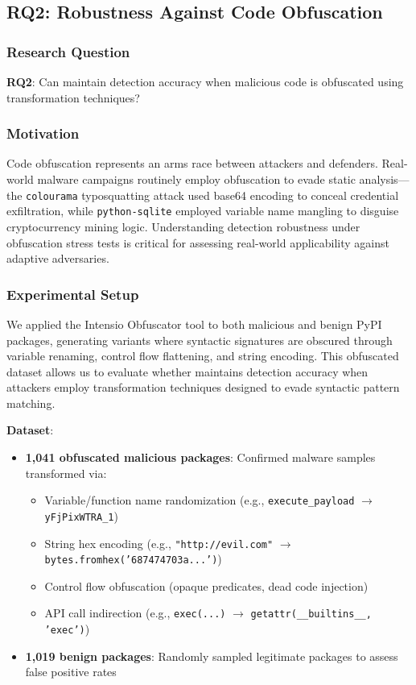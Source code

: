 \subsection{RQ2: Robustness Against Code Obfuscation}

\subsubsection{Research Question}

\textbf{RQ2}: Can \tool{} maintain detection accuracy when malicious code is obfuscated using transformation techniques?

\subsubsection{Motivation}

Code obfuscation represents an arms race between attackers and defenders. Real-world malware campaigns routinely employ obfuscation to evade static analysis---the \texttt{colourama} typosquatting attack used base64 encoding to conceal credential exfiltration, while \texttt{python-sqlite} employed variable name mangling to disguise cryptocurrency mining logic. Understanding detection robustness under obfuscation stress tests is critical for assessing real-world applicability against adaptive adversaries.

\subsubsection{Experimental Setup}

We applied the Intensio Obfuscator tool to both malicious and benign PyPI packages, generating variants where syntactic signatures are obscured through variable renaming, control flow flattening, and string encoding. This obfuscated dataset allows us to evaluate whether \tool{} maintains detection accuracy when attackers employ transformation techniques designed to evade syntactic pattern matching.

\textbf{Dataset}:
\begin{itemize}
    \item \textbf{1,041 obfuscated malicious packages}: Confirmed malware samples transformed via:
    \begin{itemize}
        \item Variable/function name randomization (e.g., \texttt{execute\_payload} $\rightarrow$ \texttt{yFjPixWTRA\_1})
        \item String hex encoding (e.g., \texttt{"http://evil.com"} $\rightarrow$ \texttt{bytes.fromhex('687474703a...')})
        \item Control flow obfuscation (opaque predicates, dead code injection)
        \item API call indirection (e.g., \texttt{exec(...)} $\rightarrow$ \texttt{getattr(\_\_builtins\_\_, 'exec')})
    \end{itemize}
    \item \textbf{1,019 benign packages}: Randomly sampled legitimate packages to assess false positive rates
\end{itemize}

